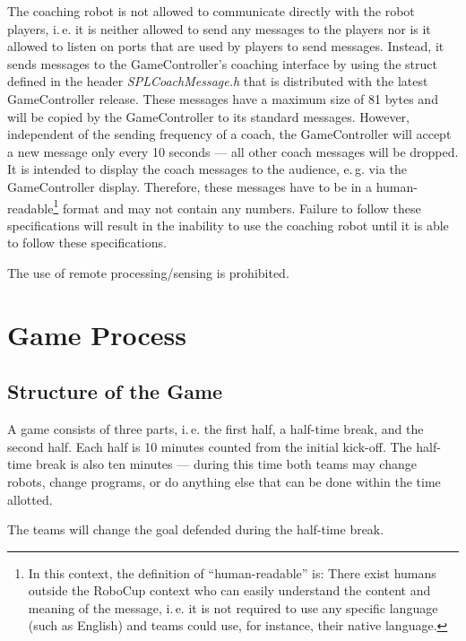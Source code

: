 \documentclass[12pt]{article}
\newcommand{\ie}{\mbox{i.\,e.}\xspace}
\newcommand{\eg}{\mbox{e.\,g.}\xspace}
\begin{document}
The coaching robot is not allowed to communicate directly with the robot players, \ie it is neither allowed to send any messages to the players nor is it allowed to listen on ports that are used by players to send messages. Instead, it sends messages to the GameController's coaching interface by using the struct defined in the header \emph{SPLCoachMessage.h} that is distributed with the latest GameController release. These messages have a maximum size of 81 bytes and will be copied by the GameController to its standard messages. However, independent of the sending frequency of a coach, the GameController will accept a new message only every 10 seconds --- all other coach messages will be dropped.  It is intended to display the coach messages to the audience, \eg via the GameController display. Therefore, these messages have to be in a human-readable\footnote{In this context, the definition of ``human-readable'' is: There exist humans outside the RoboCup context who can easily understand the content and meaning of the message, \ie it is not required to use any specific language (such as English) and teams could use, for instance, their native language.} format and may not contain any numbers.  Failure to follow these specifications will result in the inability to use the coaching robot until it is able to follow these specifications.

The use of remote processing/sensing is prohibited.


\newpage


\section{Game Process}
\label{sec:game_process}

\subsection{Structure of the Game}
\label{sec:game_struct}

A game consists of three parts, \ie the first half, a half-time break, and the second half. Each half is 10 minutes counted from the initial kick-off. The half-time break is also ten minutes --- during this time both teams may change robots, change programs, or do anything else that can be done within the time allotted. 

The teams will change the goal defended during the half-time break.
\end{document}
